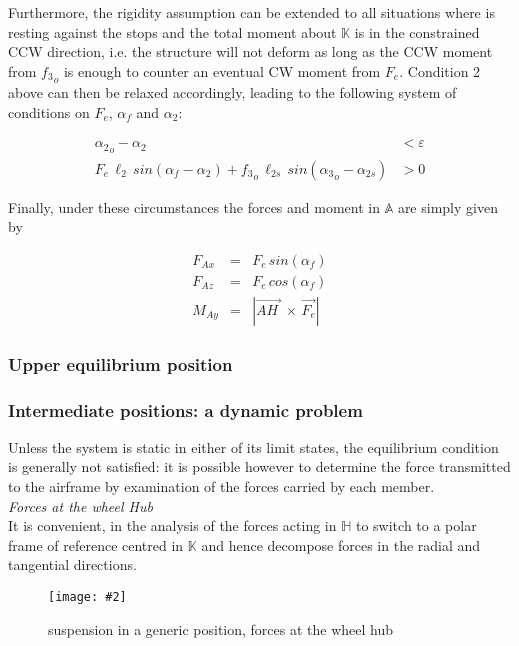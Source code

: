 \documentclass[12pt,a4paper]{report}
\newcommand*\circled[1]{
\tikz[baseline=(char.base)]{
    \node[shape=circle,draw,inner sep=1pt] (char) {#1};}
}
\newcommand{\figura}[5][htbp]{
\begin{figure}[#1]
\begin{center}
\texttt{[image: \#2]}
\caption{#4}\label{#5}
\end{center}
\end{figure}
}
\begin{document}
Furthermore, the rigidity assumption can be extended to all situations where \circled{2} is resting against the stops
and the total moment about $\mathds{K}$ is in the constrained CCW direction, i.e. the structure will not deform as long as the CCW moment from
${f_3}_{o}$ is enough to counter an eventual CW moment from $F_e$.
Condition 2 above can then be relaxed accordingly, leading to the following system of conditions 
on $F_e$, $\alpha_f$ and $\alpha_2$: 

\begin{eqnarray}
{\alpha_2}_{o} - \alpha_2 & <\varepsilon \\
F_e \, \ell_2 \,sin(\alpha_f - \alpha_2) + {f_3}_{o} \, \ell_{2s} \, sin({\alpha_3}_{o} - \alpha_{2s}) & > 0
\end{eqnarray}

Finally, under these circumstances the forces and moment in $\mathds{A}$ are simply given by

\begin{eqnarray}
F_{Ax} & = & F_e \, sin(\alpha_f)\\
F_{Az} & = & F_e \, cos(\alpha_f)\\
M_{Ay} & = & |\overrightarrow{AH\:} \, \times \, \vec{F_e}|
\end{eqnarray}

\subsubsection*{Upper equilibrium position}

\subsubsection*{Intermediate positions: a dynamic problem}
Unless the system is static in either of its limit states, the equilibrium condition is generally not satisfied:
it is possible however to determine the force transmitted to the airframe by examination of the forces
carried by each member.\\

\emph{Forces at the wheel Hub} \\
It is convenient, in the analysis of the forces acting in $\mathds{H}$ to switch to a polar frame of reference
centred in $\mathds{K}$ and hence decompose forces in the radial and tangential directions.
\figura{piczero.jpg}{}{suspension in a generic position, forces at the wheel hub}{fig:hubforces}
\end{document}
